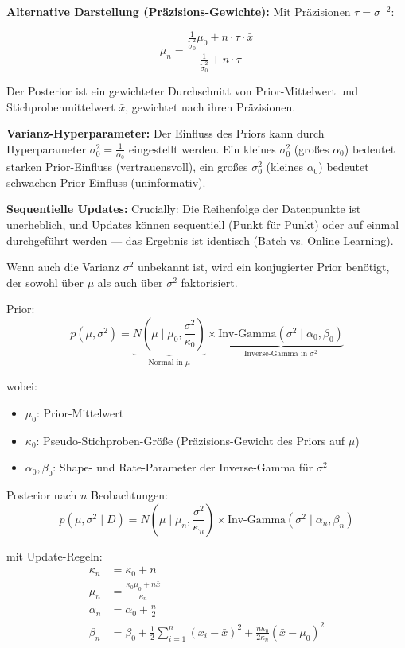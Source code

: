 \textbf{Alternative Darstellung (Präzisions-Gewichte):} Mit Präzisionen $\tau = \sigma^{-2}$:

$$\mu_n = \frac{\frac{1}{\tilde{\sigma}_0^2} \mu_0 + n \cdot \tau \cdot \bar{x}}{\frac{1}{\tilde{\sigma}_0^2} + n \cdot \tau}$$

Der Posterior ist ein gewichteter Durchschnitt von Prior-Mittelwert und Stichprobenmittelwert $\bar{x}$, gewichtet nach ihren Präzisionen.

\textbf{Varianz-Hyperparameter:} Der Einfluss des Priors kann durch Hyperparameter $\sigma_0^2 = \frac{1}{\alpha_0}$ eingestellt werden. Ein kleines $\sigma_0^2$ (großes $\alpha_0$) bedeutet starken Prior-Einfluss (vertrauensvoll), ein großes $\sigma_0^2$ (kleines $\alpha_0$) bedeutet schwachen Prior-Einfluss (uninformativ).

\textbf{Sequentielle Updates:} Crucially: Die Reihenfolge der Datenpunkte ist unerheblich, und Updates können sequentiell (Punkt für Punkt) oder auf einmal durchgeführt werden — das Ergebnis ist identisch (Batch vs. Online Learning).


Wenn auch die Varianz $\sigma^2$ unbekannt ist, wird ein konjugierter Prior benötigt, der sowohl über $\mu$ als auch über $\sigma^2$ faktorisiert.

Prior:
$$p(\mu, \sigma^2) = \underbrace{N(\mu \mid \mu_0, \frac{\sigma^2}{\kappa_0})}_{\text{Normal in } \mu} \times \underbrace{\text{Inv-Gamma}(\sigma^2 \mid \alpha_0, \beta_0)}_{\text{Inverse-Gamma in } \sigma^2}$$

wobei:
\begin{itemize}[leftmargin=1.5em]
    \item $\mu_0$: Prior-Mittelwert
    \item $\kappa_0$: Pseudo-Stichproben-Größe (Präzisions-Gewicht des Priors auf $\mu$)
    \item $\alpha_0, \beta_0$: Shape- und Rate-Parameter der Inverse-Gamma für $\sigma^2$
\end{itemize}

Posterior nach $n$ Beobachtungen:
$$p(\mu, \sigma^2 \mid D) = N(\mu \mid \mu_n, \frac{\sigma^2}{\kappa_n}) \times \text{Inv-Gamma}(\sigma^2 \mid \alpha_n, \beta_n)$$

mit Update-Regeln:
\begin{align*}
\kappa_n &= \kappa_0 + n \\
\mu_n &= \frac{\kappa_0 \mu_0 + n \bar{x}}{\kappa_n} \\
\alpha_n &= \alpha_0 + \frac{n}{2} \\
\beta_n &= \beta_0 + \frac{1}{2}\sum_{i=1}^{n}(x_i - \bar{x})^2 + \frac{n\kappa_0}{2\kappa_n}(\bar{x} - \mu_0)^2
\end{align*}

